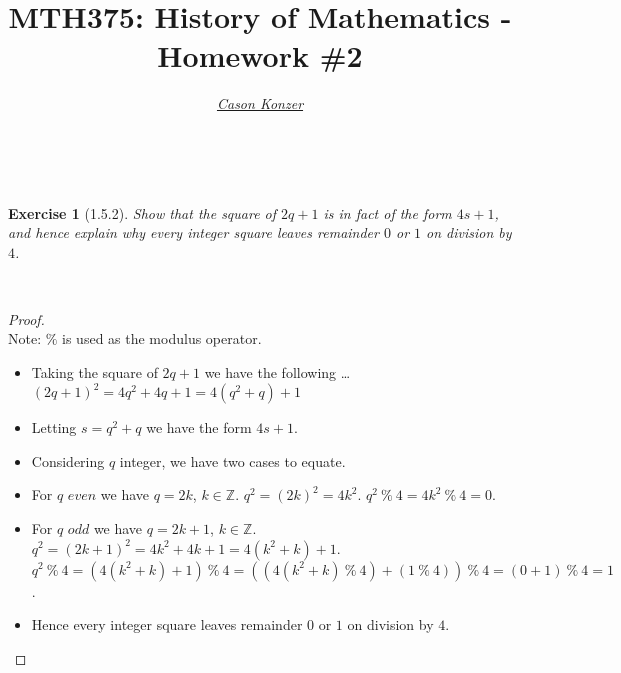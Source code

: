 \documentclass[12pt]{article}
\newcommand{\XB}{\color{black}}
\newcommand{\XBB}{\color{blue}}
\newcommand{\XV}{\color{violet}}
\theoremstyle{plain}
\newtheorem{ex}{Exercise}
\begin{document}
\title{\textbf{MTH375}: History of Mathematics - Homework \#2}
\date{}
\author{\XV\textit{\large{\href{https://github.com/casonk}{Cason Konzer}}}\XB}

\maketitle

\hrulefill

\newpage

\XBB\hrulefill\XB \\
\begin{ex} [1.5.2]
  Show that the square of $2q+1$ is in fact of the form $4s+1$, and hence explain why every integer square leaves remainder $0$ or $1$ on division by $4$.
\end{ex}
\XBB\hrulefill\XB \\
\begin{proof}
  \ \\
  Note: $\%$ is used as the modulus operator.
  \begin{itemize}
    \item Taking the square of $2q+1$ we have the following \dots
    \subitem $ (2q+1)^{2} = 4q^{2} + 4q + 1 = 4(q^{2} + q) + 1$
    \item Letting $ s = q^{2} + q $ we have the form $4s+1$.
    \item Considering $ q $ integer, we have two cases to equate.
    \item For $ q $ $even$ we have $ q = 2k$, $k \in \mathbb{Z} $.
    \subitem $ q^{2} = (2k)^{2} = 4k^{2} $.
    \subitem $ q^{2} \ \% \ 4 = 4k^{2} \ \% \ 4 = 0 $.
    \item For $ q $ $odd$ we have $ q = 2k+1$, $k \in \mathbb{Z} $.
    \subitem $ q^{2} = (2k+1)^{2} = 4k^{2} + 4k + 1 = 4(k^{2} + k) + 1 $.
    \subitem $ q^{2} \ \% \ 4 = (4(k^{2} + k) + 1) \ \% \ 4 = ((4(k^{2}+k) \ \% \ {4})+(1 \ \% \ {4})) \ \% \ {4} = (0+1) \ \% \ {4} = 1 $.
    \item Hence every integer square leaves remainder $0$ or $1$ on division by $4$.
  \end{itemize}
\end{proof}
\end{document}
